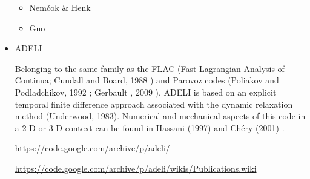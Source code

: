\begin{itemize}
\begin{scriptsize}
\begin{itemize}
\item Nem{\v{c}}ok \& Henk \cite{nehe06}
\item Guo \etal \cite{guyr16}
\end{itemize}
\end{scriptsize}

\item {\codefont ADELI} 

Belonging to the same family as the FLAC 
(Fast Lagrangian Analysis of Continua; Cundall and Board, 1988 \cite{cubo88}) 
and Parovoz codes 
(Poliakov and Podladchikov, 1992 \cite{popo92}; Gerbault \etal, 2009 \cite{gecm09}), 
ADELI is based on an explicit temporal
finite difference approach associated with the dynamic relaxation method (Underwood, 1983). 
Numerical and mechanical aspects of this code in a 2-D or 3-D context can be 
found in Hassani \etal (1997) \cite{hajc97} and Ch\'ery \etal (2001) \cite{chzh01}.

\url{https://code.google.com/archive/p/adeli/}

\url{https://code.google.com/archive/p/adeli/wikis/Publications.wiki}


\end{itemize}
